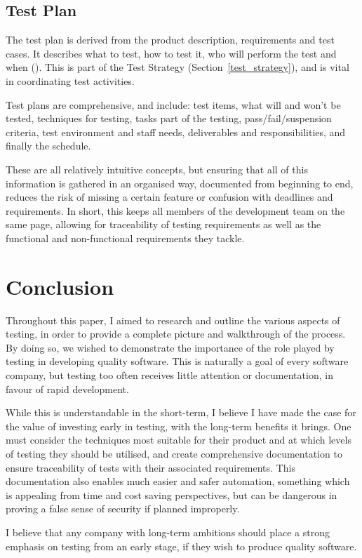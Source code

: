 \documentclass[12pt]{article}
\begin{document}
\subsection{Test Plan} \label{testplan}

The test plan is derived from the product description, requirements and test cases. It describes what to test, how to test it, who will perform the test and when (). This is part of the Test Strategy (Section~\ref{test_strategy}), and is vital in coordinating test activities.

Test plans are comprehensive, and include: test items, what will and won't be tested, techniques for testing, tasks part of the testing, pass/fail/suspension criteria, test environment and staff needs, deliverables and responsibilities, and finally the schedule. 

These are all relatively intuitive concepts, but ensuring that all of this information is gathered in an organised way, documented from beginning to end, reduces the risk of missing a certain feature or confusion with deadlines and requirements. In short, this keeps all members of the development team on the same page, allowing for traceability of testing requirements as well as the functional and non-functional requirements they tackle.




\section{Conclusion}

Throughout this paper, I aimed to research and outline the various aspects of testing, in order to provide a complete picture and walkthrough of the process. By doing so, we wished to demonstrate the importance of the role played by testing in developing quality software. This is naturally a goal of every software company, but testing too often receives little attention or documentation, in favour of rapid development.

While this is understandable in the short-term, I believe I have made the case for the value of investing early in testing, with the long-term benefits it brings. One must consider the techniques most suitable for their product and at which levels of testing they should be utilised, and create comprehensive documentation to ensure traceability of tests with their associated requirements. This documentation also enables much easier and safer automation, something which is appealing from time and cost saving perspectives, but can be dangerous in proving a false sense of security if planned improperly.

I believe that any company with long-term ambitions should place a strong emphasis on testing from an early stage, if they wish to produce quality software.




\renewcommand{\bibname}{References} %
\end{document}

